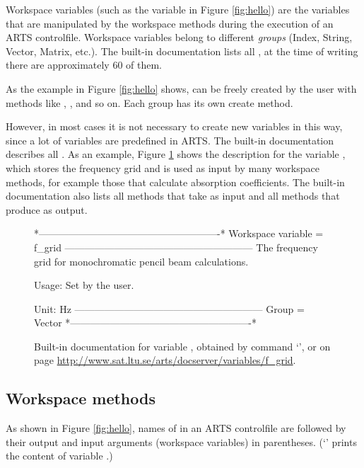 Workspace variables (such as the variable  in Figure
\ref{fig:hello}) are the variables that are manipulated by the
workspace methods during the execution of an ARTS
controlfile. Workspace variables belong to different \emph{groups}
(Index, String, Vector, Matrix, etc.). The built-in documentation
lists all , at the time of writing there are
approximately 60 of them.

As the example in Figure \ref{fig:hello} shows,  can be freely created by the user with methods like
, , and so on.
Each group has its own create method.

However, in most cases it is not necessary to create new variables in
this way, since a lot of variables are predefined in ARTS. The
built-in documentation describes all . As an example, Figure \ref{fig:f_grid} shows the
description for the variable , which stores the
frequency grid and is used as input by many workspace methods, for
example those that calculate absorption coefficients. The built-in
documentation also lists all methods that take  as
input and all methods that produce  as output.

\begin{figure}
\begin{code}
*-------------------------------------------------------*
Workspace variable = f_grid
---------------------------------------------------------
The frequency grid for monochromatic pencil beam 
calculations.

Usage: Set by the user.
 
Unit:  Hz
---------------------------------------------------------
Group = Vector
*-------------------------------------------------------*
\end{code}
\caption{Built-in documentation for variable , obtained by
  command `', or on page
  \url{http://www.sat.ltu.se/arts/docserver/variables/f_grid}.} 
\label{fig:f_grid}
\end{figure}

\subsection{Workspace methods}
%
As shown in Figure \ref{fig:hello}, names of  in an ARTS
controlfile are followed by their output and input arguments (workspace
variables) in parentheses. (`' prints the content of variable
.)


